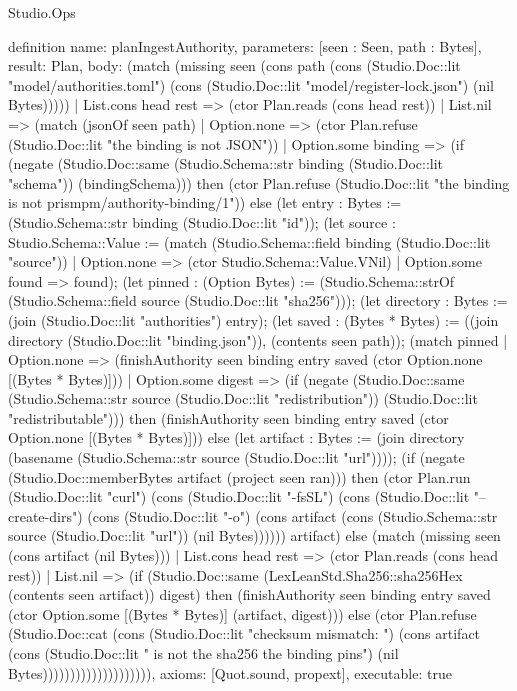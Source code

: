 \begin{lexlean}{Studio.Ops}
\begin{semanticmodule}
definition{
  name: planIngestAuthority,
  parameters: [seen : Seen, path : Bytes],
  result: Plan,
  body: (match (missing seen (cons path (cons (Studio.Doc::lit "model/authorities.toml") (cons (Studio.Doc::lit "model/register-lock.json") (nil Bytes)))))
    | List.cons head rest => (ctor Plan.reads (cons head rest))
    | List.nil => (match (jsonOf seen path)
      | Option.none => (ctor Plan.refuse (Studio.Doc::lit "the binding is not JSON\n"))
      | Option.some binding => (if (negate (Studio.Doc::same (Studio.Schema::str binding (Studio.Doc::lit "schema")) (bindingSchema))) then (ctor Plan.refuse (Studio.Doc::lit "the binding is not prismpm/authority-binding/1\n")) else (let entry : Bytes := (Studio.Schema::str binding (Studio.Doc::lit "id")); (let source : Studio.Schema::Value := (match (Studio.Schema::field binding (Studio.Doc::lit "source"))
          | Option.none => (ctor Studio.Schema::Value.VNil)
          | Option.some found => found); (let pinned : (Option Bytes) := (Studio.Schema::strOf (Studio.Schema::field source (Studio.Doc::lit "sha256"))); (let directory : Bytes := (join (Studio.Doc::lit "authorities") entry); (let saved : (Bytes * Bytes) := ((join directory (Studio.Doc::lit "binding.json")), (contents seen path)); (match pinned
          | Option.none => (finishAuthority seen binding entry saved (ctor Option.none [(Bytes * Bytes)]))
          | Option.some digest => (if (negate (Studio.Doc::same (Studio.Schema::str source (Studio.Doc::lit "redistribution")) (Studio.Doc::lit "redistributable"))) then (finishAuthority seen binding entry saved (ctor Option.none [(Bytes * Bytes)])) else (let artifact : Bytes := (join directory (basename (Studio.Schema::str source (Studio.Doc::lit "url")))); (if (negate (Studio.Doc::memberBytes artifact (project seen ran))) then (ctor Plan.run (Studio.Doc::lit "curl") (cons (Studio.Doc::lit "-fsSL") (cons (Studio.Doc::lit "--create-dirs") (cons (Studio.Doc::lit "-o") (cons artifact (cons (Studio.Schema::str source (Studio.Doc::lit "url")) (nil Bytes)))))) artifact) else (match (missing seen (cons artifact (nil Bytes)))
            | List.cons head rest => (ctor Plan.reads (cons head rest))
            | List.nil => (if (Studio.Doc::same (LexLeanStd.Sha256::sha256Hex (contents seen artifact)) digest) then (finishAuthority seen binding entry saved (ctor Option.some [(Bytes * Bytes)] (artifact, digest))) else (ctor Plan.refuse (Studio.Doc::cat (cons (Studio.Doc::lit "checksum mismatch: ") (cons artifact (cons (Studio.Doc::lit " is not the sha256 the binding pins\n") (nil Bytes)))))))))))))))))))),
  axioms: [Quot.sound, propext],
  executable: true
}



\end{semanticmodule}
\end{lexlean}
